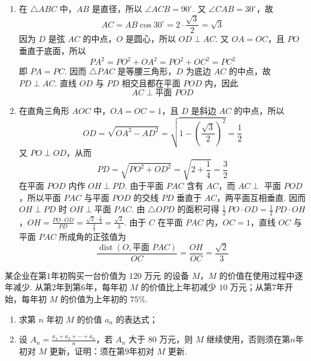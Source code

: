 \begin{solution}
\begin{enumerate}
\item
在 \(\triangle ABC\) 中，\(AB\) 是直径，所以
\(\angle ACB=90^\circ\). 又 \(\angle CAB=30^\circ\)，故
\[
AC=AB\cos30^\circ=2\cdot\frac{\sqrt3}{2}=\sqrt3
\]
因为 \(D\) 是弦 \(AC\) 的中点，\(O\) 是圆心，所以
\(OD\perp AC\). 又 \(OA=OC\)，且 \(PO\) 垂直于底面，所以
\[
PA^2=PO^2+OA^2=PO^2+OC^2=PC^2
\]
即 \(PA=PC\). 因而 \(\triangle PAC\) 是等腰三角形，\(D\) 为底边
\(AC\) 的中点，故 \(PD\perp AC\). 直线 \(OD\) 与 \(PD\) 相交且都在平面 \(POD\) 内，因此
\[
AC\perp\text{平面 }POD
\]

\item
在直角三角形 \(AOC\) 中，\(OA=OC=1\)，且 \(D\) 是斜边 \(AC\) 的中点，所以
\[
OD=\sqrt{OA^2-AD^2}
=\sqrt{1-\left(\frac{\sqrt3}{2}\right)^2}
=\frac12
\]
又 \(PO\perp OD\)，从而
\[
PD=\sqrt{PO^2+OD^2}
=\sqrt{2+\frac14}
=\frac32
\]
在平面 \(POD\) 内作 \(OH\perp PD\). 由于平面 \(PAC\) 含有
\(AC\)，而 \(AC\perp\) 平面 \(POD\)，所以平面 \(PAC\) 与平面 \(POD\) 的交线
\(PD\) 垂直于 \(AC\)，两平面互相垂直. 因而 \(OH\perp PD\) 时
\(OH\perp\text{平面 }PAC\). 由 \(\triangle OPD\) 的面积可得
\(\frac12\,PO\cdot OD=\frac12\,PD\cdot OH\)，\(OH=\frac{PO\cdot OD}{PD} =\frac{\sqrt2\cdot\frac12}{\frac32} =\frac{\sqrt2}{3}\).
由于 \(C\) 在平面 \(PAC\) 内，\(OC=1\)，直线 \(OC\) 与平面 \(PAC\) 所成角的正弦值为
\[
\frac{\operatorname{dist}(O,\text{平面 }PAC)}{OC}
=\frac{OH}{OC}
=\frac{\sqrt2}{3}
\]
\end{enumerate}
\end{solution}

\begin{problem}
某企业在第\(1\)年初购买一台价值为 \(120\text{ 万元}\) 的设备 \(M\)，\(M\) 的价值在使用过程中逐年减少. 从第\(2\)年到第\(6\)年，每年初 \(M\) 的价值比上年初减少 \(10\text{ 万元}\)；从第\(7\)年开始，每年初 \(M\) 的价值为上年初的 \(75\%\).
\begin{enumerate}
\item 求第 \(n\) 年初 \(M\) 的价值 \(a_{n}\) 的表达式；
\item 设 \(A_{n} = \frac{a_{1} + a_{2} + \cdots + a_{n}}{n}\)，若 \(A_{n}\) 大于 \(80\text{ 万元}\)，则 \(M\) 继续使用，否则须在第\(n\)年初对 \(M\) 更新，证明：须在第\(9\)年初对 \(M\) 更新.
\end{enumerate}
\end{problem}

